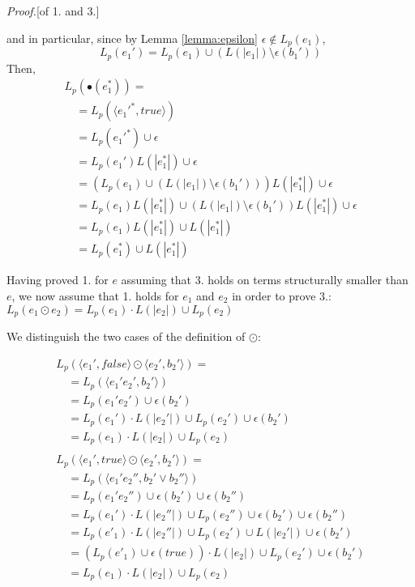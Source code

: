 \documentclass[preprint]{sigplanconf}
\newcommand{\true}{\mathit{true}}
\newcommand{\false}{\mathit{false}}
\newcommand{\Le}[1]{L(#1)}
\newcommand{\Lp}[1]{L_p(#1)}
\newcounter{item}
\newenvironment{proof}{\begin{trivlist}\item[]{\em Proof.}}{\end{trivlist}}
\begin{document}
\begin{proof}[of 1. and 3.]
\begin{itemize}
and in particular, since by Lemma \ref{lemma:epsilon} $\epsilon \not\in \Lp{e_1}$, 
\[\Lp{e_1'} = \Lp{e_1} \cup (\Le{|e_1|}\setminus \epsilon(b_1'))\]
Then,
\[\begin{array}{l}
L_p(\bullet(e_1^*)) =\\
\quad = L_p(\langle e_1'^*,true\rangle)\\
\quad = L_p(e_1'^*) \cup \epsilon\\
\quad = L_p(e_1')\Le{|e_1^*|} \cup \epsilon\\
\quad = (\Lp{e_1} \cup (\Le{|e_1|}\setminus \epsilon(b_1')))\Le{|e_1^*|}  \cup \epsilon\\
\quad = \Lp{e_1}\Le{|e_1^*|} \cup (\Le{|e_1|}\setminus \epsilon(b_1'))\Le{|e_1^*|} \cup \epsilon\\
\quad = \Lp{e_1}\Le{|e_1^*|} \cup \Le{|e_1^*|}\\
\quad = \Lp{e_1^*} \cup \Le{|e_1^*|}
\end{array}\]
\end{itemize}

\noindent
Having proved 1. for $e$ assuming that 3. holds on terms structurally smaller
than $e$, we now assume that 1. holds for $e_1$ and $e_2$ in order to
prove 3.:
$L_p(e_1 \odot e_2) = L_p(e_1) \cdot L(|e_2|) \cup  L_p(e_2)$

We distinguish the two cases of the definition of $\odot$:

$$\begin{array}{l}
L_p(\langle e_1',\false \rangle \odot \langle e_2',b_2' \rangle) = \\
\quad = L_p(\langle e_1'e_2',b_2' \rangle) \\
\quad = L_p(e_1'e_2') \cup \epsilon(b_2') \\
\quad = L_p(e_1')\cdot L(|e_2'|) \cup L_p(e_2') \cup \epsilon(b_2')\\
\quad = L_p(e_1)\cdot L(|e_2|) \cup L_p(e_2)\\ \\
L_p(\langle e_1',true \rangle \odot \langle e_2',b_2' \rangle) = \\
\quad = L_p(\langle e_1'e_2'',b_2'\vee b_2'' \rangle) \\
\quad = L_p(e_1'e_2'') \cup \epsilon(b_2') \cup \epsilon(b_2'') \\
\quad = L_p(e_1')\cdot L(|e_2''|) \cup L_p(e_2'') \cup \epsilon(b_2')
 \cup \epsilon(b_2'')\\
\quad = L_p(e'_1)\cdot L(|e_2''|) \cup L_p(e_2') \cup L(|e_2'|) \cup \epsilon(b_2')\\
\quad = (L_p(e'_1) \cup \epsilon(\true)) \cdot L(|e_2|) \cup L_p(e_2') \cup \epsilon(b_2')\\
\quad = L_p(e_1)\cdot L(|e_2|) \cup L_p(e_2)
\end{array}$$
\end{proof}
\end{document}
